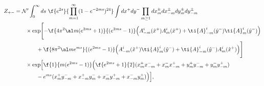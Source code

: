 \begin{equation}
\begin{split}
Z_{+-}
&={\cal N}' \int_{0}^{\infty} ds\ \f{e^{2s}}{\prod_{m=1}^\infty
(1-e^{-2ms})^{24}}\int dx^+dy^-
\prod_{m\geq 1}dx^{\pm}_{m}dx^{\pm}_{-m}dy^\pm_{m}dy^\pm_{-m}\\
&\qquad \times
\exp\Biggl[-\f{4\pi^2\al m(e^{2ms}+1)}{(e^{2ms}-1)}
\Bigl(A^i_{-m}(\hat{x}^+)A^i_{m}(\hat{x}^+)
+\ti{A}^i_{-m}(\hat{y}^-)\ti{A}^i_{m}(\hat{y}^-)\Bigr)\\
& \qquad  \qquad +\f{8\pi^2\al m e^{ms}}{(e^{2ms}-1)}
\Bigl(A^i_{-m}(\hat{x}^+)\ti{A}^i_{m}(\hat{y}^-)
+\ti{A}^i_{-m}(\hat{y}^-)A^i_{m}(\hat{x}^+)\Bigr)\Biggr]\\
&\qquad \times\exp\Bigl[\f{1}{m(e^{2ms}-1)}\Bigl(\f{e^{2ms}+1}{2}
(x^+_m x^-_{-m}+x^-_m x^+_{-m}+y^+_m y^-_{-m}+y^-_m y^+_{-m})\\
& \qquad  \qquad -e^{ms}(x^+_m y^-_{-m}+x^+_{-m} y^-_{m}
+x^-_m y^+_{-m}+x^-_{-m} y^+_{m})\Bigr)\Bigr],
\end{split}
\end{equation}

